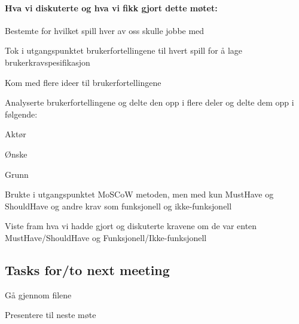 \documentclass[norsk,a4paper]{meetingmins}
\begin{document}
\maketitle

\paragraph{Hva vi diskuterte og hva vi fikk gjort dette møtet:}

\begin{items}
\item
Bestemte for hvilket spill hver av oss skulle jobbe med
\item
Tok i utgangspunktet brukerfortellingene til hvert spill for å lage brukerkravspesifikasjon
\item
Kom med flere ideer til brukerfortellingene 
\item Analyserte brukerfortellingene og delte den opp i flere deler og delte dem opp i følgende:
	\begin {items}
		\item Aktør 
		\item Ønske
		\item Grunn
    \end{items}
\item
Brukte i utgangspunktet MoSCoW metoden, men med kun MustHave og ShouldHave og andre krav som funksjonell og ikke-funksjonell
\item
Viste fram hva vi hadde gjort og diskuterte kravene om de var enten MustHave/ShouldHave og Funksjonell/Ikke-funksjonell
\end{items}

\subsection{Tasks for/to next meeting}
\begin{items}
\item
Gå gjennom filene
\item
Presentere til neste møte
\end{items}

\vspace{1em}
\end{document}
